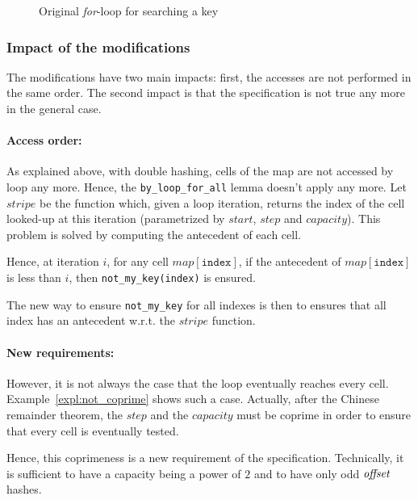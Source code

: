 \documentclass[oneside]{article}
\begin{document}
\begin{figure}[b]
	
	\caption{Original \emph{for}-loop for searching a key}
	\label{fig:for_loop_orig_pruned}
\end{figure}

\subsubsection{Impact of the modifications}

The modifications have two main impacts: first, the accesses are not performed in the same order. The second impact is that the specification is not true any more in the general case.

\paragraph{Access order:}
As explained above, with double hashing, cells of the map are not accessed by loop any more. Hence, the \texttt{by\_loop\_for\_all} lemma doesn't apply any more. Let $stripe$ be the function which, given a loop iteration, returns the index of the cell looked-up at this iteration (parametrized by $start$, $step$ and $capacity$). This problem is solved by computing the antecedent of each cell. 

Hence, at iteration $i$, for any cell $map[\mathtt{index}]$, if the antecedent of $map[\mathtt{index}]$ is less than $i$, then \texttt{not\_my\_key(index)} is ensured.

The new way to ensure \texttt{not\_my\_key} for all indexes is then to ensures that all index has an antecedent w.r.t. the $stripe$ function.

\paragraph{New requirements:}
However, it is not always the case that the loop eventually reaches every cell. Example~\ref{expl:not_coprime} shows such a case. Actually, after the Chinese remainder theorem, the $step$ and the $capacity$ must be coprime in order to ensure that every cell is eventually tested.

Hence, this coprimeness is a new requirement of the specification. Technically, it is sufficient to have a capacity being a power of $2$ and to have only odd $\text{\emph{offset}}$ hashes.
\end{document}
